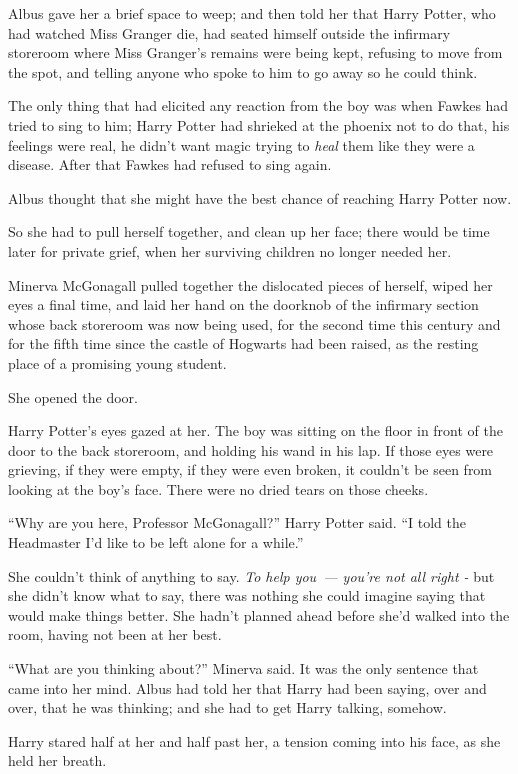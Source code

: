 Albus gave her a brief space to weep; and then told her that Harry Potter, who had watched Miss Granger die, had seated himself outside the infirmary storeroom where Miss Granger's remains were being kept, refusing to move from the spot, and telling anyone who spoke to him to go away so he could think.

The only thing that had elicited any reaction from the boy was when Fawkes had tried to sing to him; Harry Potter had shrieked at the phoenix not to do that, his feelings were real, he didn't want magic trying to \emph{heal} them like they were a disease. After that Fawkes had refused to sing again.

Albus thought that she might have the best chance of reaching Harry Potter now.

So she had to pull herself together, and clean up her face; there would be time later for private grief, when her surviving children no longer needed her.

Minerva McGonagall pulled together the dislocated pieces of herself, wiped her eyes a final time, and laid her hand on the doorknob of the infirmary section whose back storeroom was now being used, for the second time this century and for the fifth time since the castle of Hogwarts had been raised, as the resting place of a promising young student.

She opened the door.

Harry Potter's eyes gazed at her. The boy was sitting on the floor in front of the door to the back storeroom, and holding his wand in his lap. If those eyes were grieving, if they were empty, if they were even broken, it couldn't be seen from looking at the boy's face. There were no dried tears on those cheeks.

``Why are you here, Professor McGonagall?'' Harry Potter said. ``I told the Headmaster I'd like to be left alone for a while.''

She couldn't think of anything to say. \emph{To help you~--- you're not all right -} but she didn't know what to say, there was nothing she could imagine saying that would make things better. She hadn't planned ahead before she'd walked into the room, having not been at her best.

``What are you thinking about?'' Minerva said. It was the only sentence that came into her mind. Albus had told her that Harry had been saying, over and over, that he was thinking; and she had to get Harry talking, somehow.

Harry stared half at her and half past her, a tension coming into his face, as she held her breath.

